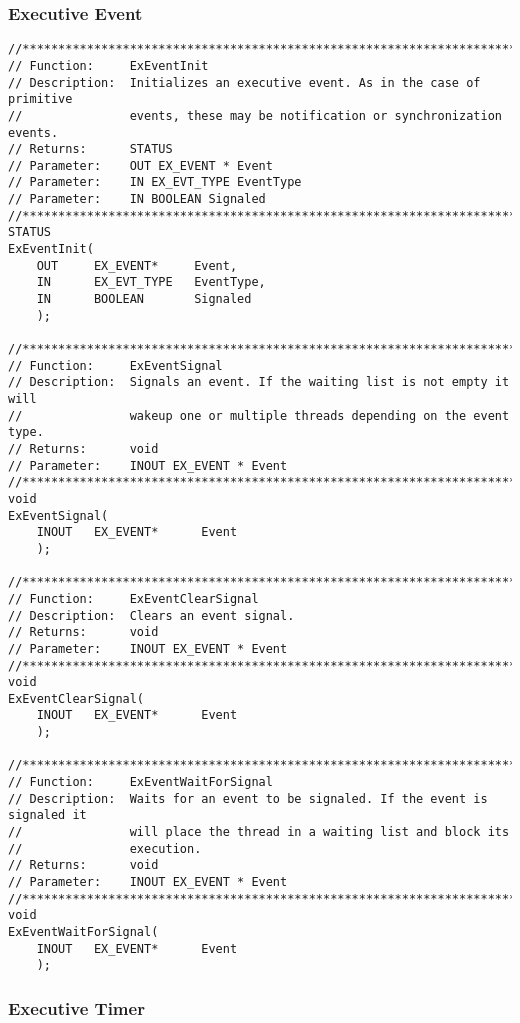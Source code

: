 \begin{appendices}
\subsubsection{Executive Event}
\label{sect:ExEvent}


\begin{lstlisting}[caption={Executive Event Functions},label={lst:ExEventFunc}]
//******************************************************************************
// Function:     ExEventInit
// Description:  Initializes an executive event. As in the case of primitive
//               events, these may be notification or synchronization events.
// Returns:      STATUS
// Parameter:    OUT EX_EVENT * Event
// Parameter:    IN EX_EVT_TYPE EventType
// Parameter:    IN BOOLEAN Signaled
//******************************************************************************
STATUS
ExEventInit(
    OUT     EX_EVENT*     Event,
    IN      EX_EVT_TYPE   EventType,
    IN      BOOLEAN       Signaled
    );

//******************************************************************************
// Function:     ExEventSignal
// Description:  Signals an event. If the waiting list is not empty it will
//               wakeup one or multiple threads depending on the event type.
// Returns:      void
// Parameter:    INOUT EX_EVENT * Event
//******************************************************************************
void
ExEventSignal(
    INOUT   EX_EVENT*      Event
    );

//******************************************************************************
// Function:     ExEventClearSignal
// Description:  Clears an event signal.
// Returns:      void
// Parameter:    INOUT EX_EVENT * Event
//******************************************************************************
void
ExEventClearSignal(
    INOUT   EX_EVENT*      Event
    );

//******************************************************************************
// Function:     ExEventWaitForSignal
// Description:  Waits for an event to be signaled. If the event is signaled it
//               will place the thread in a waiting list and block its
//               execution.
// Returns:      void
// Parameter:    INOUT EX_EVENT * Event
//******************************************************************************
void
ExEventWaitForSignal(
    INOUT   EX_EVENT*      Event
    );
\end{lstlisting}

\subsubsection{Executive Timer}
\label{sect:ExTimer}


\end{appendices}

